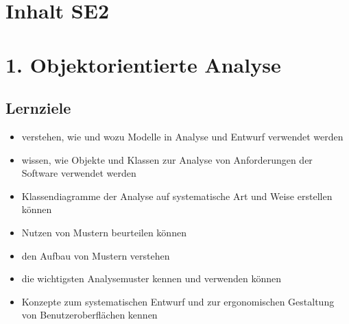 \section{Inhalt SE2}

\section*{1. Objektorientierte Analyse}

\subsection*{Lernziele}
\begin{itemize}
    \item verstehen, wie und wozu Modelle in Analyse und Entwurf verwendet werden
    \item wissen, wie Objekte und Klassen zur Analyse von Anforderungen der Software verwendet werden
    \item Klassendiagramme der Analyse auf systematische Art und Weise erstellen können
    \item Nutzen von Mustern beurteilen können
    \item den Aufbau von Mustern verstehen
    \item die wichtigsten Analysemuster kennen und verwenden können
    \item Konzepte zum systematischen Entwurf und zur ergonomischen Gestaltung von Benutzeroberflächen kennen
\end{itemize}

